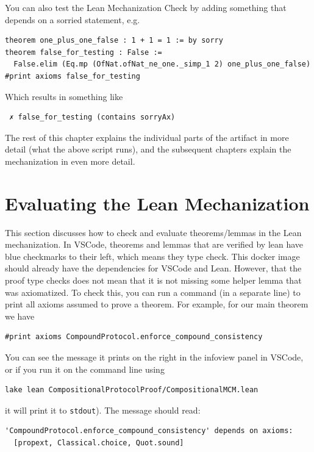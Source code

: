 You can also test the Lean Mechanization Check by adding something that depends on a sorried statement, e.g.
\begin{verbatim}
theorem one_plus_one_false : 1 + 1 = 1 := by sorry
theorem false_for_testing : False := 
  False.elim (Eq.mp (OfNat.ofNat_ne_one._simp_1 2) one_plus_one_false)
#print axioms false_for_testing
\end{verbatim}

Which results in something like
\begin{verbatim}
 ✗ false_for_testing (contains sorryAx)
\end{verbatim}

The rest of this chapter explains the individual parts of the artifact in more detail (what the above script runs), and the subsequent chapters explain the mechanization in even more detail.

\section{Evaluating the Lean Mechanization}
\label{sec:readme-lean-mechianization}

This section discusses how to check and evaluate theorems/lemmas in the Lean mechanization.
In VSCode, theorems and lemmas that are verified by lean have blue checkmarks to their left, which means they type check. 
This docker image should already have the dependencies for VSCode and Lean.
However, that the proof type checks does not mean that it is not missing some helper lemma that was axiomatized.
To check this, you can run a command (in a separate line) to print all axioms assumed to prove a theorem. For example, for our main theorem we have

\begin{verbatim}
#print axioms CompoundProtocol.enforce_compound_consistency
\end{verbatim}

You can see the message it prints on the right in the infoview panel in VSCode, or if you run it on the command line using
\begin{verbatim}
lake lean CompositionalProtocolProof/CompositionalMCM.lean
\end{verbatim}
it will print it to \texttt{stdout}). The message should read:

\begin{verbatim}
'CompoundProtocol.enforce_compound_consistency' depends on axioms:
  [propext, Classical.choice, Quot.sound]
\end{verbatim}

